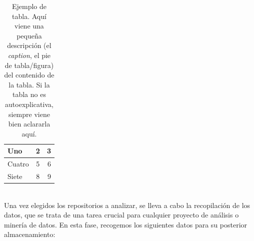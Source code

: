 \documentclass[a4paper, 12pt]{book}
\begin{document}
\begin{table}
 \begin{center}
  \begin{tabular}{ | l | c | r |} %
    \hline
    Uno & 2 & 3 \\ \hline %
    Cuatro & 5 & 6 \\ \hline
    Siete & 8 & 9 \\
    \hline
  \end{tabular}
  \caption{Ejemplo de tabla. Aquí viene una pequeña descripción (el \emph{caption}, el pie de tabla/figura) del contenido de la tabla. Si la tabla no es autoexplicativa, siempre viene bien aclararla aquí.}
  \label{tab:repositorios}
 \end{center}
\end{table}

\\Una vez elegidos los repositorios a analizar, se lleva a cabo la recopilación de los datos, que se trata de una tarea crucial para cualquier proyecto de análisis o minería de datos. En esta fase, recogemos los siguientes datos para su posterior 
almacenamiento:
\end{document}
